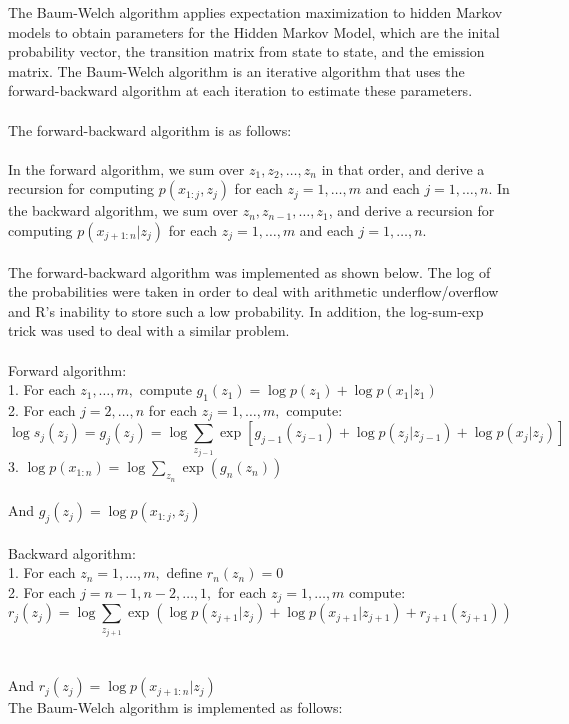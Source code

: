 \documentclass{article}
\begin{document}
The Baum-Welch algorithm applies expectation maximization to hidden Markov models to obtain parameters for the Hidden Markov Model, which are the inital probability vector, the transition matrix from state to state, and the emission matrix. The Baum-Welch algorithm is an iterative algorithm that uses the forward-backward algorithm at each iteration to estimate these parameters.  \\ 
\\ 
The forward-backward algorithm is as follows: \\
\\ 
In the forward algorithm, we sum over $z_1, z_2, \hdots, z_n$ in that order, and derive a recursion for computing $p(x_{1:j}, z_j)$ for each $z_j = 1,\hdots,m$ and each $j = 1,\hdots,n$. In the backward algorithm, we sum over $z_n, z_{n-1}, \hdots, z_1$, and derive a recursion for computing $p(x_{j+1:n} | z_j)$ for each $z_j = 1,\hdots,m$ and each $j = 1,\hdots,n$. \\ 
\\ 
The forward-backward algorithm was implemented as shown below. The log of the probabilities were taken in order to deal with arithmetic underflow/overflow and R's inability to store such a low probability. In addition, the log-sum-exp trick was used to deal with a similar problem. \\
\\
Forward algorithm: \\ 
1. For each $z_1,\hdots, m,$ compute $g_1(z_1) = \log p(z_1) + \log p(x_1 | z_1)$ \\ 
2. For each $j = 2, \hdots, n$ for each $z_j = 1,\hdots, m,$ compute:
$$\log s_j(z_j) = g_j(z_j) = \log \sum_{z_{j-1}} \exp [g_{j-1}(z_{j-1}) + \log p(z_j | z_{j-1}) + \log p(x_j|z_j) ] $$
3. $\log p(x_{1:n}) = \log \sum_{z_n} \exp(g_n(z_n))$ \\ 
\\
And $g_j(z_j) = \log p(x_{1:j}, z_j)$ \\
\\ 
Backward algorithm: \\ 
1. For each $z_n = 1,\hdots, m,$ define $r_n(z_n) = 0$ \\ 
2. For each $j = n - 1, n - 2, \hdots, 1,$ for each $z_j = 1,\hdots,m$ compute:
$$r_j(z_j) = \log \sum_{z_{j+1}} \exp (\log p(z_{j+1}|z_j) + \log p(x_{j+1}|z_{j+1}) + r_{j+1} (z_{j+1}))$$ \\ 
\\ 
And $r_j(z_j) = \log p(x_{j+1:n}|z_j)$
\\ 
The Baum-Welch algorithm is implemented as follows:
\end{document}
